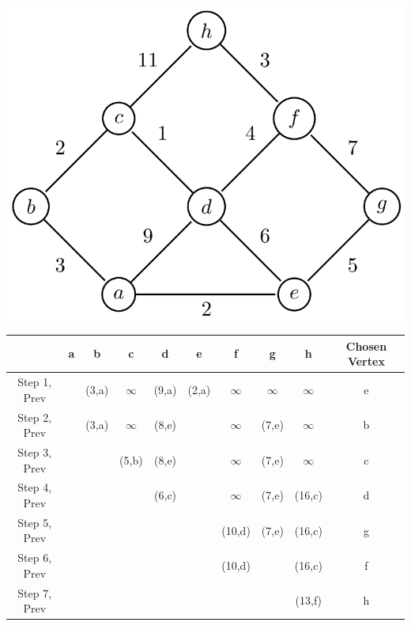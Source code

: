 \documentclass[12pt]{article}
\begin{document}
\begin{enumerate}
\begin{center}
\includegraphics[scale=.5]{3-1.png}
\end{center}
\begin{tabular}{|c|c|c|c|c|c|c|c|c|c|}\hline
				 &     a    &     b    &     c    &     d    &     e    &     f    &     g    &     h    & Chosen Vertex       \\\hline
	Step 1, Prev &          &   (3,a)  & $\infty$ &   (9,a)  &   (2,a)  & $\infty$ & $\infty$ & $\infty$ & e \\\hline
	Step 2, Prev &          &   (3,a)  & $\infty$ &   (8,e)  &          & $\infty$ &   (7,e)  & $\infty$ & b \\\hline
	Step 3, Prev &          &          &   (5,b)  &   (8,e)  &          & $\infty$ &   (7,e)  & $\infty$ & c \\\hline
	Step 4, Prev &          &          &          &   (6,c)  &          & $\infty$ &   (7,e)  &  (16,c)  & d \\\hline
	Step 5, Prev &          &          &          &          &          &  (10,d)  &   (7,e)  &  (16,c)  & g \\\hline
	Step 6, Prev &          &          &          &          &          &  (10,d)  &          &  (16,c)  & f \\\hline
	Step 7, Prev &          &          &          &          &          &          &          &  (13,f)  & h \\\hline
\end{tabular}
\end{enumerate}
\end{document}
